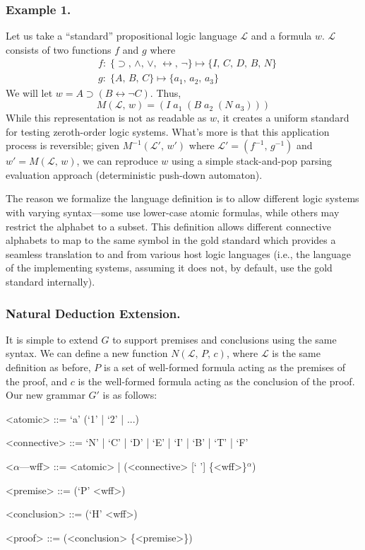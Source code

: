 \documentclass[ms]{uncgdissertationexp2}
\theoremstyle{plain}
\theoremstyle{definition}
\theoremstyle{remark}
\begin{document}
    \subsubsection{Example 1.} Let us take a ``standard'' propositional logic language $\mathcal{L}$ and a formula $w$. $\mathcal{L}$ consists of two functions $f$ and $g$ where
    \begin{align*}
        &f:\;\{\supset,\,\land,\,\lor,\,\leftrightarrow,\,\lnot\}\mapsto \{I,\,C,\,D,\,B,\,N\}\\
        &g:\;\{A,\,B,\,C\} \mapsto \{a_{1},\,a_{2},\,a_{3}\}
    \end{align*}
    We will let $w = A \supset (B \leftrightarrow \lnot C)$. Thus, 
    \[
        M(\mathcal{L},\,w) = (I\;a_{1}\;(B\;a_{2}\;(N\;a_{3})))
    \]
    While this representation is not as readable as $w$, it creates a uniform standard for testing zeroth-order logic systems. What's more is that this application process is reversible; given $M^{-1}(\mathcal{L}',\,w')$ where $\mathcal{L}' = (f^{-1},\,g^{-1})$ and $w' = M(\mathcal{L},\,w)$, we can reproduce $w$ using a simple stack-and-pop parsing evaluation approach (deterministic push-down automaton).
    
    The reason we formalize the language definition is to allow different logic systems with varying syntax---some use lower-case atomic formulas, while others may restrict the alphabet to a subset. This definition allows different connective alphabets to map to the same symbol in the gold standard which provides a seamless translation to and from various host logic languages (i.e., the language of the implementing systems, assuming it does not, by default, use the gold standard internally).

    \subsubsection{Natural Deduction Extension.} It is simple to extend $G$ to support premises and conclusions using the same syntax. We can define a new function $N(\mathcal{L},\,P,\,c)$, where $\mathcal{L}$ is the same definition as before, $P$ is a set of well-formed formula acting as the premises of the proof, and $c$ is the well-formed formula acting as the conclusion of the proof. Our new grammar $G'$ is as follows:

\begin{grammar}
<atomic> ::= `a' (`1' | `2' | ...)

<connective> ::= `N' | `C' | `D' | `E' | `I' | `B' | `T' | `F' 

<$\alpha$---wff> ::= <atomic> | (<connective> [` '] \{<wff>\}$^{\alpha}$)

<premise> ::= (`P' <wff>)

<conclusion> ::= (`H' <wff>)

<proof> ::= (<conclusion> \{<premise>\})
\end{grammar}
\end{document}
